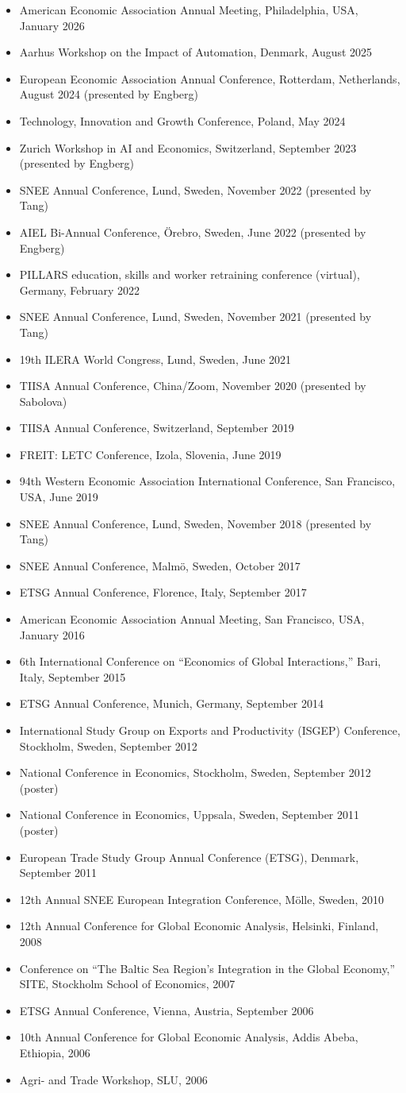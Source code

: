 \documentclass[11pt,a4paper]{article}
\newcommand{\cventry}[1]{\item #1}
\begin{document}
\begin{itemize}
  \cventry{American Economic Association Annual Meeting, Philadelphia, USA, January 2026}
  \cventry{Aarhus Workshop on the Impact of Automation, Denmark, August 2025}
  \cventry{European Economic Association Annual Conference, Rotterdam, Netherlands, August 2024 (presented by Engberg)}
  \cventry{Technology, Innovation and Growth Conference, Poland, May 2024}
  \cventry{Zurich Workshop in AI and Economics, Switzerland, September 2023 (presented by Engberg)}
  \cventry{SNEE Annual Conference, Lund, Sweden, November 2022 (presented by Tang)}
  \cventry{AIEL Bi-Annual Conference, Örebro, Sweden, June 2022 (presented by Engberg)}
  \cventry{PILLARS education, skills and worker retraining conference (virtual), Germany, February 2022}
  \cventry{SNEE Annual Conference, Lund, Sweden, November 2021 (presented by Tang)}
  \cventry{19th ILERA World Congress, Lund, Sweden, June 2021}
  \cventry{TIISA Annual Conference, China/Zoom, November 2020 (presented by Sabolova)}
  \cventry{TIISA Annual Conference, Switzerland, September 2019}
  \cventry{FREIT: LETC Conference, Izola, Slovenia, June 2019}
  \cventry{94th Western Economic Association International Conference, San Francisco, USA, June 2019}
  \cventry{SNEE Annual Conference, Lund, Sweden, November 2018 (presented by Tang)}
  \cventry{SNEE Annual Conference, Malmö, Sweden, October 2017}
  \cventry{ETSG Annual Conference, Florence, Italy, September 2017}
  \cventry{American Economic Association Annual Meeting, San Francisco, USA, January 2016}
  \cventry{6th International Conference on ``Economics of Global Interactions,'' Bari, Italy, September 2015}
  \cventry{ETSG Annual Conference, Munich, Germany, September 2014}
  \cventry{International Study Group on Exports and Productivity (ISGEP) Conference, Stockholm, Sweden, September 2012}
  \cventry{National Conference in Economics, Stockholm, Sweden, September 2012 (poster)}
  \cventry{National Conference in Economics, Uppsala, Sweden, September 2011 (poster)}
  \cventry{European Trade Study Group Annual Conference (ETSG), Denmark, September 2011}
  \cventry{12th Annual SNEE European Integration Conference, Mölle, Sweden, 2010}
  \cventry{12th Annual Conference for Global Economic Analysis, Helsinki, Finland, 2008}
  \cventry{Conference on ``The Baltic Sea Region's Integration in the Global Economy,'' SITE, Stockholm School of Economics, 2007}
  \cventry{ETSG Annual Conference, Vienna, Austria, September 2006}
  \cventry{10th Annual Conference for Global Economic Analysis, Addis Abeba, Ethiopia, 2006}
  \cventry{Agri- and Trade Workshop, SLU, 2006}
\end{itemize}
\end{document}
